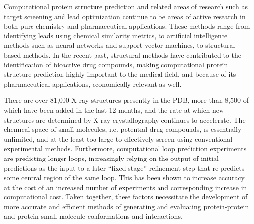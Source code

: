 Computational protein structure prediction and related areas of research such as target screening and lead optimization continue to be areas of active research in both pure chemistry and pharmaceutical applications\cite{jorgensen2009efficient}.
These methods range from identifying leads using chemical similarity metrics, to artificial intelligence methods such as neural networks and support vector machines, to structural based methods\cite{geppert2010current}.
In the recent past, structural methods have contributed to the identification of bioactive drug compounds\cite{corsino2009novel}, making computational protein structure prediction highly important to the medical field, and because of its pharmaceutical applications, economically relevant as well.

There are over 81,000 X-ray structures presently in the PDB, more than 8,500 of which have been added in the last 12 months, and the rate at which new structures are determined by X-ray crystallography continues to accelerate\cite{berman2007worldwide}.
The chemical space of small molecules, i.e. potential drug compounds, is essentially unlimited, and at the least too large to effectively screen using conventional experimental methods\cite{jorgensen2009efficient}. 
Furthermore, computational loop prediction experiments are predicting longer loops, increasingly relying on the output of initial predictions as the input to a later ``fixed stage'' refinement step that re-predicts some central region of the same loop.
This has been shown to increase accuracy \cite{jacobson2004hierarchical} at the cost of an increased number of experiments and corresponding increase in computational cost.
Taken together, these factors necessitate the development of more accurate and efficient methods of generating and evaluating protein-protein and protein-small molecule conformations and interactions.

